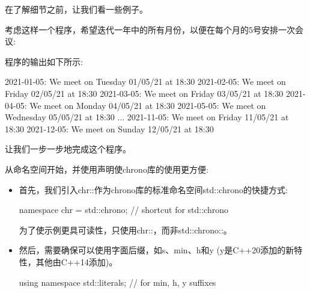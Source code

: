 
在了解细节之前，让我们看一些例子。


考虑这样一个程序，希望迭代一年中的所有月份，以便在每个月的5号安排一次会议:



程序的输出如下所示:

\begin{shell}
2021-01-05:
 We meet on Tuesday 01/05/21 at 18:30
2021-02-05:
 We meet on Friday 02/05/21 at 18:30
2021-03-05:
 We meet on Friday 03/05/21 at 18:30
2021-04-05:
 We meet on Monday 04/05/21 at 18:30
2021-05-05:
 We meet on Wednesday 05/05/21 at 18:30
...
2021-11-05:
 We meet on Friday 11/05/21 at 18:30
2021-12-05:
 We meet on Sunday 12/05/21 at 18:30
\end{shell}

让我们一步一步地完成这个程序。


从命名空间开始，并使用声明使chrono库的使用更方便:

\begin{itemize}
\item 
首先，我们引入chr::作为chrono库的标准命名空间std::chrono的快捷方式:

\begin{cpp}
namespace chr = std::chrono; // shortcut for std::chrono
\end{cpp}

为了使示例更具可读性，只使用chr::，而非std::chrono::。

\item
然后，需要确保可以使用字面后缀，如s、min、h和y (y是C++20添加的新特性，其他由C++14添加)。

\begin{cpp}
using namespace std::literals; // for min, h, y suffixes
\end{cpp}
\end{itemize}

